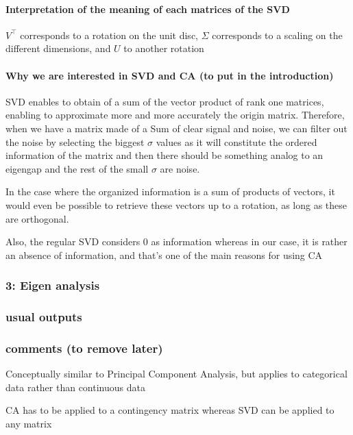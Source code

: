 \documentclass{article}
\begin{document}
\paragraph{Interpretation of the meaning of each matrices of the SVD}

$V^\intercal$ corresponds to a rotation on the unit disc, $\Sigma$ corresponds to a  scaling on the different dimensions, and $U$ to another rotation 

\paragraph{Why we are interested in SVD and CA (to put in the introduction)}

SVD enables to obtain of a sum of the vector product of rank one matrices, enabling to approximate more and more accurately the origin matrix. Therefore, when we have a matrix made of a Sum of clear signal and noise, we can filter out the noise by selecting the biggest $\sigma$ values as it will constitute the ordered information of the matrix and then there should be something analog to an eigengap and the rest of the small $\sigma$ are noise.

In the case where the organized information is a sum of products of vectors, it would even be possible to retrieve these vectors up to a rotation, as long as these are orthogonal.

Also, the regular SVD considers 0 as information whereas in our case, it is rather an absence of information, and that's one of the main reasons for using CA

\subsubsection{3: Eigen analysis}

\subsubsection{usual outputs}
\subsubsection{comments (to remove later)}
Conceptually similar to Principal Component Analysis, but applies to categorical data rather than continuous data

CA has to be applied to a contingency matrix whereas SVD can be applied to any matrix
\end{document}
